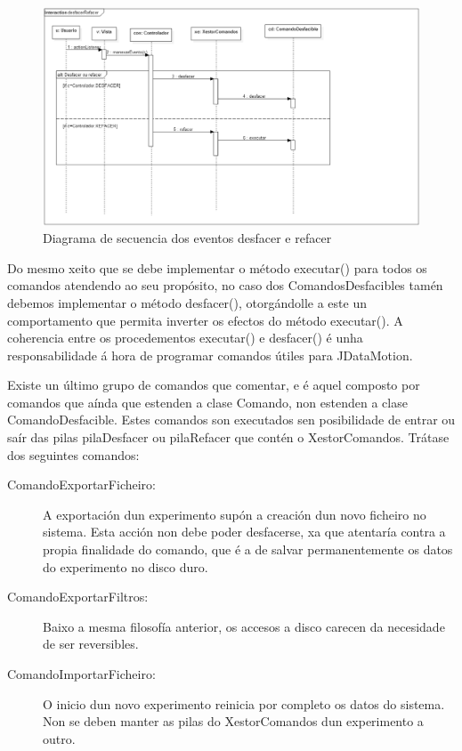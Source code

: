 \begin{figure}
\centering
\includegraphics[width=\textwidth,height=\textheight,keepaspectratio]{figuras/desfacerRefacer}
\caption{Diagrama de secuencia dos eventos desfacer e refacer}
\label{desfacerRefacer}
\end{figure}

Do mesmo xeito que se debe implementar o método executar() para todos os comandos atendendo ao seu propósito, no caso dos ComandosDesfacibles tamén debemos implementar o método desfacer(), otorgándolle a este un comportamento que permita inverter os efectos do método executar(). A coherencia entre os procedementos executar() e desfacer() é unha responsabilidade á hora de programar comandos útiles para JDataMotion.

Existe un último grupo de comandos que comentar, e é aquel composto por comandos que aínda que estenden a clase Comando, non estenden a clase ComandoDesfacible. Estes comandos son executados sen posibilidade de entrar ou saír das pilas pilaDesfacer ou pilaRefacer que contén o XestorComandos. Trátase dos seguintes comandos:

\begin{description}

\item[ComandoExportarFicheiro:]

A exportación dun experimento supón a creación dun novo ficheiro no sistema. Esta acción non debe poder desfacerse, xa que atentaría contra a propia finalidade do comando, que é a de salvar permanentemente os datos do experimento no disco duro.

\item[ComandoExportarFiltros:]

Baixo a mesma filosofía anterior, os accesos a disco carecen da necesidade de ser reversibles.

\item[ComandoImportarFicheiro:]

O inicio dun novo experimento reinicia por completo os datos do sistema. Non se deben manter as pilas do XestorComandos dun experimento a outro.

\end{description}

